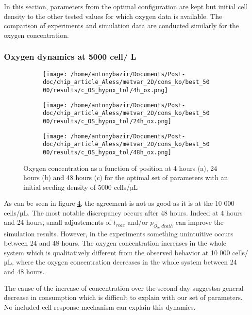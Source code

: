 \documentclass[11pt,a4paper]{article}
\begin{document}
In this section, parameters from the optimal configuration are kept but initial cell density to the other tested values for which oxygen data is available. The comparison of experiments and simulation data are conducted similarly for the oxygen concentration.

\subsubsection{Oxygen dynamics at 5000 cell/ \textmu L}
\begin{figure}[ht!]
\begin{subfigure}{0.33\textwidth}
	\centering
	\texttt{[image: /home/antonybazir/Documents/Post-doc/chip\_article\_Aless/metvar\_2D/cons\_ko/best\_5000/results/c\_OS\_hypox\_tol/4h\_ox.png]}
	\caption{ \label{4h_ox_best_5000}}
\end{subfigure}
\begin{subfigure}{0.33\textwidth}
	\centering
	\texttt{[image: /home/antonybazir/Documents/Post-doc/chip\_article\_Aless/metvar\_2D/cons\_ko/best\_5000/results/c\_OS\_hypox\_tol/24h\_ox.png]}
	\caption{ \label{24h_ox_best_5000}}
\end{subfigure}
\begin{subfigure}{0.33\textwidth}
	\centering
	\texttt{[image: /home/antonybazir/Documents/Post-doc/chip\_article\_Aless/metvar\_2D/cons\_ko/best\_5000/results/c\_OS\_hypox\_tol/48h\_ox.png]}
	\caption{ \label{48h_ox_best_5000}}
\end{subfigure}
\caption{Oxygen concentration as a function of position at 4 hours (a), 24 hours (b) and 48 hours (c) for the optimal set of parameters with an initial seeding density of 5000 cells/µL\label{Ox_best_5000}}
\end{figure}

As can be seen in figure \ref{Ox_best_5000}, the agreement is not as good as it is at the 10 000 cells/µL. The most notable discrepancy occurs after 48 hours. Indeed at 4 hours and 24 hours, small adjustements of $t_{reac}$ and/or $p_{O_2,death}$ can improve the simulation results. However, in the experiments something unintuitive occurs between 24 and 48 hours. The oxygen concentration increases in the whole system which is qualitatively different from the observed behavior at 10 000 cells/µL, where the oxygen concentration decreases in the whole system between 24 and 48 hours. 

The cause of the increase of concentration over the second day suggestsa general decrease in consumption which is difficult to explain with our set of parameters. No included cell response mechanism can explain this dynamics.
\end{document}
